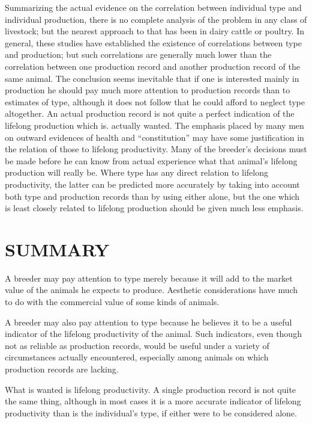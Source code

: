 Summarizing the actual evidence on the correlation between individual
type and individual production, there is no complete analysis of
the problem in any class of livestock; but the nearest approach to that
has been in dairy cattle or poultry. In general, these studies have established
the existence of correlations between type and production; but
such correlations are generally much lower than the correlation
between one production record and another production record of the
same animal. The conclusion seems inevitable that if one is interested
mainly in production he should pay much more attention to production
records than to estimates of type, although it does not follow that
he could afford to neglect type altogether. An actual production record
is not quite a perfect indication of the lifelong production which is.
actually wanted. The emphasis placed by many men on outward evidences
of health and ``constitution'' may have some justification in the relation
of those to lifelong productivity. Many of the breeder's decisions
must be made before he can know from actual experience what
that animal's lifelong production will really be. Where type has any
direct relation to lifelong productivity, the latter can be predicted more
accurately by taking into account both type and production records
than by using either alone, but the one which is least closely related to
lifelong production should be given much less emphasis.

\section*{SUMMARY}

A breeder may pay attention to type merely because it will add to
the market value of the animals he expects to produce. Aesthetic considerations
have much to do with the commercial value of some kinds of
animals.

A breeder may also pay attention to type because he believes it to be
a useful indicator of the lifelong productivity of the animal. Such indicators,
even though not as reliable as production records, would be
useful under a variety of circumstances actually encountered, especially
among animals on which production records are lacking.

What is wanted is lifelong productivity. A single production record
is not quite the same thing, although in most cases it is a more accurate
indicator of lifelong productivity than is the individual's type, if either
were to be considered alone.

